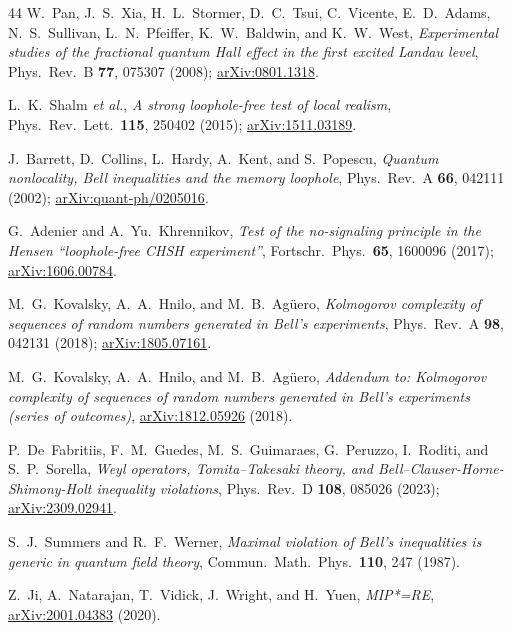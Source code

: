 \documentclass[aps,pra,twocolumn,superscriptaddress,longbibliography,floatfix,nofootinbib]{revtex4-2}
\begin{document}
\begin{thebibliography}{44}
W.~Pan, J.~S.~Xia, H.~L.~Stormer, D.~C.~Tsui, C.~Vicente, E.~D.~Adams, N.~S.~Sullivan, L.~N.~Pfeiffer, K.~W.~Baldwin, and K.~W.~West,
\textit{Experimental studies of the fractional quantum Hall effect in the first excited Landau level},
Phys.\ Rev.\ B \textbf{77}, 075307 (2008);
\href{https://arxiv.org/abs/0801.1318}{arXiv:0801.1318}.


L.~K.~Shalm \emph{et al.},
\textit{A strong loophole-free test of local realism},
Phys.\ Rev.\ Lett.\ \textbf{115}, 250402 (2015);
\href{https://arxiv.org/abs/1511.03189}{arXiv:1511.03189}.

J.~Barrett, D.~Collins, L.~Hardy, A.~Kent, and S.~Popescu,
\textit{Quantum nonlocality, Bell inequalities and the memory loophole},
Phys.\ Rev.\ A \textbf{66}, 042111 (2002);
\href{https://arxiv.org/abs/quant-ph/0205016}{arXiv:quant-ph/0205016}.

G.~Adenier and A.~Yu.~Khrennikov,
\textit{Test of the no-signaling principle in the Hensen ``loophole-free CHSH experiment''},
Fortschr.\ Phys.\ \textbf{65}, 1600096 (2017);
\href{https://arxiv.org/abs/1606.00784}{arXiv:1606.00784}.

M.~G.~Kovalsky, A.~A.~Hnilo, and M.~B.~Ag\"uero,
\textit{Kolmogorov complexity of sequences of random numbers generated in Bell's experiments},
Phys.\ Rev.\ A \textbf{98}, 042131 (2018);
\href{https://arxiv.org/abs/1805.07161}{arXiv:1805.07161}.

M.~G.~Kovalsky, A.~A.~Hnilo, and M.~B.~Ag\"uero,
\textit{Addendum to: Kolmogorov complexity of sequences of random numbers generated in Bell's experiments (series of outcomes)},
\href{https://arxiv.org/abs/1812.05926}{arXiv:1812.05926} (2018).

P.~De~Fabritiis, F.~M.~Guedes, M.~S.~Guimaraes, G.~Peruzzo, I.~Roditi, and S.~P.~Sorella,
\textit{Weyl operators, Tomita--Takesaki theory, and Bell--Clauser-Horne-Shimony-Holt inequality violations},
Phys.\ Rev.\ D \textbf{108}, 085026 (2023);
\href{https://arxiv.org/abs/2309.02941}{arXiv:2309.02941}.

S.~J.~Summers and R.~F.~Werner,
\textit{Maximal violation of Bell's inequalities is generic in quantum field theory},
Commun.\ Math.\ Phys.\ \textbf{110}, 247 (1987).

Z.~Ji, A.~Natarajan, T.~Vidick, J.~Wright, and H.~Yuen,
\textit{MIP*=RE},
\href{https://arxiv.org/abs/2001.04383}{arXiv:2001.04383} (2020).


\end{thebibliography}
\end{document}
